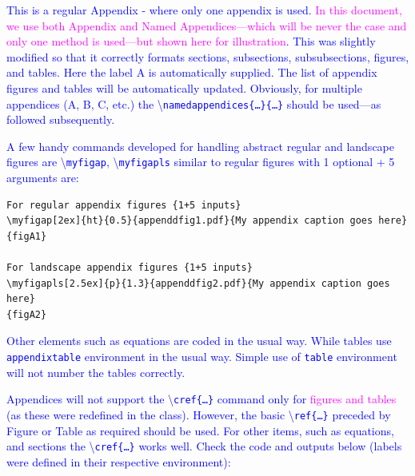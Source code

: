\documentclass[phd]{ndsu-thesis-2022}
\newcommand\italk[1]{\textcolor{blue}{#1}}  %
\newcommand\cmd[1]{\textbackslash\texttt{#1}}  %
\begin{document}
\renewcommand{\bibname}{REFERENCES}

\makerefs %

\label{biblio}



\appendix %

\italk{This is a regular Appendix - where only one appendix is used. \textcolor{magenta}{In this document, we use both Appendix and Named Appendices---which will be never the case and only one method is used---but shown here for illustration}. This was slightly modified so that it correctly formats sections, subsections, subsubsections, figures, and tables. Here the label A is automatically supplied. The list of appendix figures and tables will be automatically updated. Obviously, for multiple appendices (A, B, C, etc.) the \cmd{namedappendices\{\ldots\}\{\ldots\}} should be used---as followed subsequently.}

\italk{A few handy commands developed for handling abstract regular and landscape figures are \cmd{myfigap}, \cmd{myfigapls} similar to regular figures with 1 optional + 5 arguments are: } 

\label{figv}
\vspace{2ex}
{\singlespacing
\begin{verbatim}
For regular appendix figures {1+5 inputs}
\myfigap[2ex]{ht}{0.5}{appenddfig1.pdf}{My appendix caption goes here}
{figA1}

For landscape appendix figures {1+5 inputs}
\myfigapls[2.5ex]{p}{1.3}{appenddfig2.pdf}{My appendix caption goes here}
{figA2}
\end{verbatim}
}

\italk{Other elements such as equations are coded in the usual way. While tables use \texttt{appendixtable} environment in the usual way. Simple use of \texttt{table} environment will not number the tables correctly.}

\italk{Appendices will not support the \cmd{cref\{\ldots\}} command only for \textcolor{magenta}{figures and tables} (as these were redefined in the class). However, the basic \cmd{ref\{\ldots\}} preceded by Figure or Table as required should be used. For other items, such as equations, and sections the \cmd{cref\{\ldots\}} works well. Check the code and outputs below (labels were defined in their respective environment):}
\end{document}
